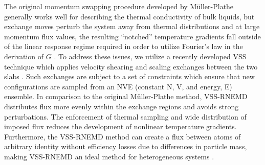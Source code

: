 The original momentum swapping procedure developed by M{\"u}ller-Plathe \cite{:/content/aip/journal/jcp/106/14/10.1063/1.473271, PhysRevE.59.4894} generally works well for describing the thermal conductivity of bulk liquids, but exchange moves perturb the system away from thermal distributions and at large momentum flux values, the resulting “notched” temperature gradients fall outside of the linear response regime required in order to utilize Fourier’s law in the derivation of $G$ \cite{:/content/aip/journal/jcp/132/1/10.1063/1.3276454}.  To address these issues, we utilize a recently developed VSS technique which applies velocity shearing and scaling exchanges between the two slabs \cite{doi:10.1080/00268976.2012.680512}.  Such exchanges are subject to a set of constraints which ensure that new configurations are sampled from an NVE (constant N, V, and energy, E) ensemble. In comparison to the original M{\"u}ller-Plathe method, VSS-RNEMD distributes flux more evenly within the exchange regions and avoids strong perturbations. The enforcement of thermal sampling and wide distribution of imposed flux reduces the development of nonlinear temperature gradients. Furthermore, the VSS-RNEMD method can create a flux between atoms of arbitrary identity without efficiency losses due to differences in particle mass, making VSS-RNEMD an ideal method for heterogeneous systems \cite{doi:10.1080/00268976.2012.680512}.  \par

